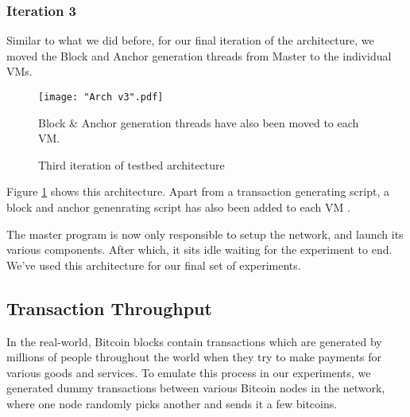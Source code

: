 
\subsubsection{Iteration 3} \label{impl-arch-3}

Similar to what we did before, for our final iteration of the architecture, we moved the Block and Anchor generation threads from Master to the individual VMs.

\begin{figure}[!htb]
    \centering
    \texttt{[image: "Arch v3".pdf]}
    \caption{Third iteration of testbed architecture}
    
    \medskip
    \footnotesize
    Block \& Anchor generation threads have also been moved to each VM.
    \label{fig-impl-arch-3}
\end{figure}

Figure \ref{fig-impl-arch-3} shows this architecture. Apart from a transaction generating script, a block and anchor genenrating script has also been added to each VM .

The master program is now only responsible to setup the network, and launch its various components. After which, it sits idle waiting for the experiment to end. We've used this architecture for our final set of experiments.


\subsection{Transaction Throughput} \label{impl-transactions}

In the real-world, Bitcoin blocks contain transactions which are generated by millions of people throughout the world when they try to make payments for various goods and services.  To emulate this process in our experiments, we generated dummy transactions between various Bitcoin nodes in the network, where one node randomly picks another and sends it a few bitcoins.


